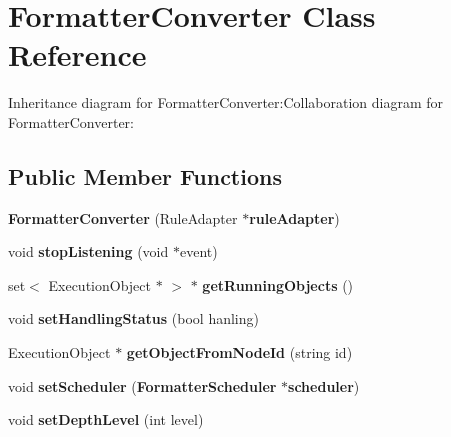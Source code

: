 \section{FormatterConverter Class Reference}
\label{classbr_1_1pucrio_1_1telemidia_1_1ginga_1_1ncl_1_1emconverter_1_1FormatterConverter}
Inheritance diagram for FormatterConverter:Collaboration diagram for FormatterConverter:\subsection*{Public Member Functions}
\begin{CompactItemize}
\item 
\textbf{FormatterConverter} (RuleAdapter $\ast${\bf ruleAdapter})\label{classbr_1_1pucrio_1_1telemidia_1_1ginga_1_1ncl_1_1emconverter_1_1FormatterConverter_512d39d67168a29d4f4fef63e609b4ce}

\item 
void \textbf{stopListening} (void $\ast$event)\label{classbr_1_1pucrio_1_1telemidia_1_1ginga_1_1ncl_1_1emconverter_1_1FormatterConverter_30fe02416806f60f10cfcc8e42cbefb3}

\item 
set$<$ ExecutionObject $\ast$ $>$ $\ast$ \textbf{getRunningObjects} ()\label{classbr_1_1pucrio_1_1telemidia_1_1ginga_1_1ncl_1_1emconverter_1_1FormatterConverter_35b87aba248cb45d5a865463c0f67a54}

\item 
void \textbf{setHandlingStatus} (bool hanling)\label{classbr_1_1pucrio_1_1telemidia_1_1ginga_1_1ncl_1_1emconverter_1_1FormatterConverter_5de48b8f7342a6c209987a8493283779}

\item 
ExecutionObject $\ast$ \textbf{getObjectFromNodeId} (string id)\label{classbr_1_1pucrio_1_1telemidia_1_1ginga_1_1ncl_1_1emconverter_1_1FormatterConverter_de2114a15bc1adea59e0de11075bfdb5}

\item 
void \textbf{setScheduler} ({\bf FormatterScheduler} $\ast${\bf scheduler})\label{classbr_1_1pucrio_1_1telemidia_1_1ginga_1_1ncl_1_1emconverter_1_1FormatterConverter_d08c528e926dd20eda4d1b5931d2d585}

\item 
void \textbf{setDepthLevel} (int level)\label{classbr_1_1pucrio_1_1telemidia_1_1ginga_1_1ncl_1_1emconverter_1_1FormatterConverter_6cc1df8863810a31889fd61256f04076}


\end{CompactItemize}

